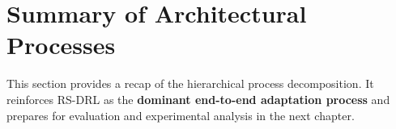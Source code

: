 \documentclass[11pt,a4paper]{article}
\begin{document}

\section{Summary of Architectural Processes}
\label{sec:summary}

This section provides a recap of the hierarchical process decomposition. It reinforces RS-DRL as the \textbf{dominant end-to-end adaptation process} and prepares for evaluation and experimental analysis in the next chapter.
\end{document}
